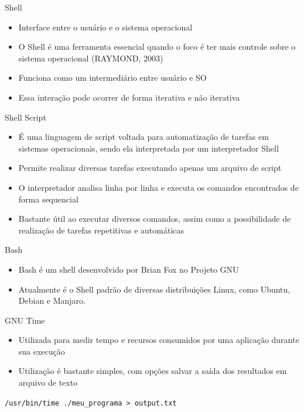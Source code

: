 \begin{frame}{Shell}
    \begin{itemize}
        \item Interface entre o usuário e o sistema operacional
        \item O Shell é uma ferramenta essencial quando o foco é ter mais controle sobre o sistema operacional (RAYMOND, 2003)
        \item Funciona como um intermediário entre usuário e SO
        \item Essa interação pode ocorrer de forma iterativa e não iterativa
    \end{itemize}
\end{frame}

\begin{frame}{Shell Script}
    \begin{itemize}
        \item É uma linguagem de script voltada para automatização de tarefas em sistemas operacionais, sendo ela interpretada por um interpretador Shell
        \item Permite realizar diversas tarefas executando apenas um arquivo de script
        \item O interpretador analisa linha por linha e executa os comandos encontrados de forma sequencial
        \item Bastante útil ao executar diversos comandos, assim como a possibilidade de realização de tarefas repetitivas e automáticas
    \end{itemize}
\end{frame}

\begin{frame}{Bash}
    \begin{itemize}
        \item Bash é um shell desenvolvido por Brian Fox no Projeto GNU
        \item Atualmente é o Shell padrão de diversas distribuições Linux, como Ubuntu, Debian e Manjaro.
    \end{itemize}
\end{frame}

\begin{frame}{GNU Time}
    \begin{itemize}
        \item Utilizada para medir tempo e recursos consumidos por uma aplicação durante sua execução
        \item Utilização é bastante simples, com opções salvar a saída dos resultados em arquivo de texto
    \end{itemize}
    
    \begin{center}
        \texttt{/usr/bin/time ./meu\_programa > output.txt}
    \end{center}
\end{frame}

